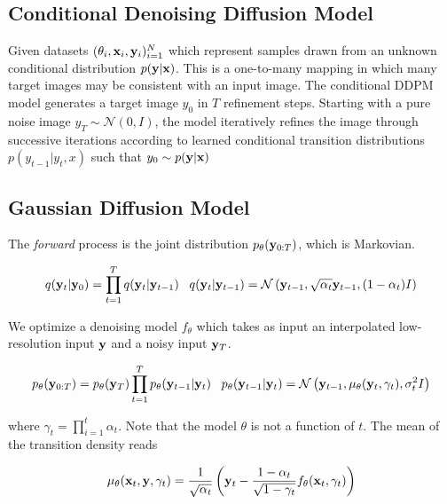 \documentclass{article}
\begin{document}
\subsection{Conditional Denoising Diffusion Model}

Given datasets $(\theta_{i}, \bold{x}_i,\bold{y}_i)_{i=1}^{N}$ which represent samples drawn from an unknown conditional distribution $p(\bold{y}|\bold{x})$. This is a one-to-many mapping in which many target images may be consistent with an input image. The conditional DDPM model generates a target image $y_0$ in $T$ refinement steps. Starting with a pure noise image $y_{T}\sim \mathcal{N}(0,I)$, the model iteratively refines the image through successive iterations according to learned conditional transition distributions $p(y_{t-1}|y_{t},x)$ such that $y_{0} \sim p(\bold{y}|\bold{x})$ 

\subsection{Gaussian Diffusion Model}

The \emph{forward} process is the joint distribution $p_{\theta}(\bold{y}_{0:T})$, which is Markovian. 

\begin{equation}
q(\bold{y}_{t}|\bold{y}_{0}) = \prod_{t=1}^{T}q(\bold{y}_{t}|\bold{y}_{t-1}) \;\;\; q(\bold{y}_{t}|\bold{y}_{t-1}) = \mathcal{N}\left(\bold{y}_{t-1},\sqrt{\alpha_{t}}\bold{y}_{t-1},(1-\alpha_{t})I\right)
\end{equation}

We optimize a denoising model $f_{\theta}$ which takes as input an interpolated low-resolution input $\bold{y}$ and a noisy input $\bold{y}_{T}$. 

\begin{equation}
p_{\theta}(\bold{y}_{0:T}) = p_{\theta}(\bold{y}_{T})\prod_{t=1}^{T} p_{\theta}(\bold{y}_{t-1}|\bold{y}_{t}) \;\;\; p_{\theta}(\bold{y}_{t-1}|\bold{y}_{t}) = \mathcal{N}\left(\bold{y}_{t-1},\mu_{\theta}(\bold{y}_{t},\gamma_{t}),\sigma^{2}_{t}I\right)
\end{equation}

where $\gamma_{t}=\prod_{i=1}^{t}\alpha_{t}$. Note that the model $\theta$ is not a function of $t$. The mean of the transition density reads

\begin{equation}
\mu_{\theta}(\bold{x}_{t},\bold{y},\gamma_{t}) = \frac{1}{\sqrt{\alpha_{t}}}\left(\bold{y}_t-\frac{1-\alpha_{t}}{\sqrt{1-\gamma_{t}}}f_{\theta}(\bold{x}_{t},\gamma_{t})\right)
\end{equation}
\end{document}
